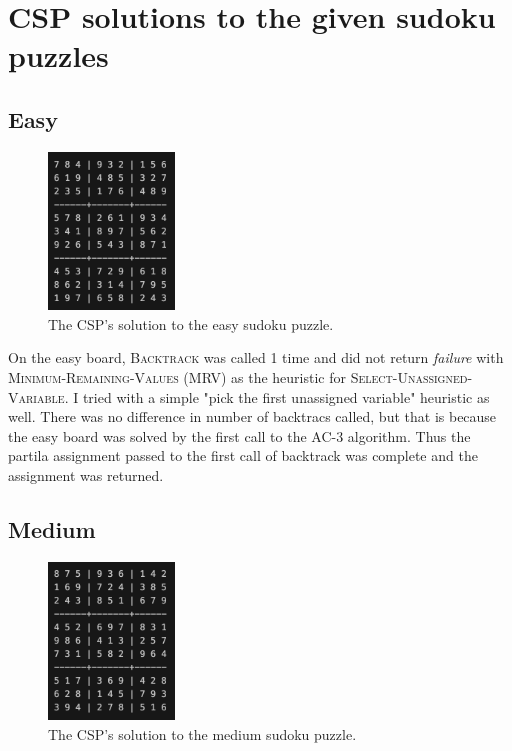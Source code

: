 \section*{CSP solutions to the given sudoku puzzles}

\subsection*{Easy}

\begin{figure}[h!]
    \centering
    \includegraphics[width=0.3\textwidth]{"../Images/easy.png"}
    \caption{The CSP's solution to the easy sudoku puzzle.}
\end{figure}

On the easy board, \textsc{Backtrack} was called 1 time and did not return \textit{failure} with \textsc{Minimum-Remaining-Values} (MRV) as the heuristic for \textsc{Select-Unassigned-Variable}. I tried with a simple "pick the first unassigned variable" heuristic as well. There was no difference in number of backtracs called, but that is because the easy board was solved by the first call to the \textsc{AC-3} algorithm. Thus the partila assignment passed to the first call of backtrack was complete and the assignment was returned. 

\subsection*{Medium}

\begin{figure}[h!]
    \centering
    \includegraphics[width=0.3\textwidth]{"../Images/medium.png"}
    \caption{The CSP's solution to the medium sudoku puzzle.}
\end{figure}

